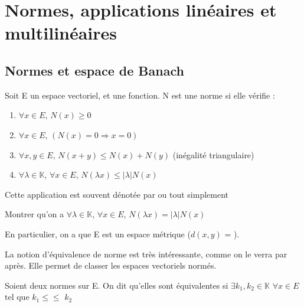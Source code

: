 \chapter{Normes, applications linéaires et multilinéaires}
\label{chapter_linear_application}



\section{Normes et espace de Banach}

\begin{definition}
    Soit E un espace vectoriel, et  une fonction.
    N est une norme si elle vérifie :
    \begin{enumerate}
        \item $\forall x \in E$, $N(x) \geq 0$
        \item $\forall x \in E$, $(N(x) = 0 \Rightarrow x = 0)$
        \item $\forall x, y \in E$, $N(x + y) \leq N(x) + N(y)$ (inégalité
            triangulaire)
        \item $\forall \lambda \in \mathbb{K}$, $\forall x \in E$, $N(\lambda x)
            \leq |\lambda| N(x)$
    \end{enumerate}
    Cette application est souvent dénotée par  ou tout simplement
\end{definition}

\begin{exercice}
    Montrer qu'on a
    $\forall \lambda \in \mathbb{K}$, $\forall x \in E$, $N(\lambda x) =
    |\lambda| N(x)$
\end{exercice}

En particulier, on a que E est un espace métrique ($d(x, y)$ = ).

La notion d'équivalence de norme est très intéressante, comme on le verra par
après. Elle permet de classer les espaces vectoriels normés.

\begin{definition}
    Soient deux normes   sur E. On dit
	qu'elles sont équivalentes si $\exists k_{1}, k_{2} \in \mathbb{K}$ $\forall
	x \in E$ tel que $k_{1}$$\leq$$\leq$
	$k_{2}$
\end{definition}

